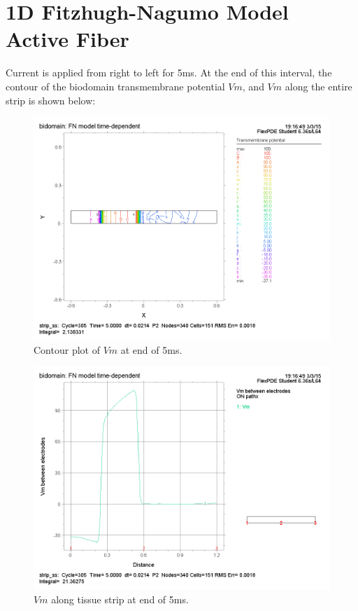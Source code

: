\documentclass{article}
\author{Allen Yin}
\begin{document}
\maketitle
\setlength\parskip{0.1in}

\section{1D Fitzhugh-Nagumo Model Active Fiber}
Current is applied from right to left for 5ms. At the end of this interval, the contour of the biodomain transmembrane potential $Vm$, and $Vm$ along the entire strip is shown below:

\begin{figure}[H]
    \begin{center}
        \includegraphics[scale=0.5]{1Dstrip_contourVm_t=5ms.png}
        \caption{Contour plot of $Vm$ at end of 5ms.}
    \end{center}
\end{figure}

\begin{figure}[H]
    \begin{center}
        \includegraphics[scale=0.5]{1Dstrip_VmAlongStrip_t=5ms.png}
        \caption{$Vm$ along tissue strip at end of 5ms.}
    \end{center}
\end{figure}
\end{document}
